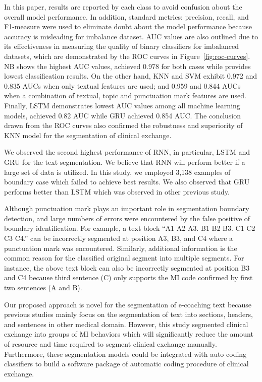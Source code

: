 \documentclass{amia}
\begin{document}
In this paper, results are reported by each class to avoid confusion about the overall model performance. In addition, standard metrics: precision, recall, and F1-measure were used to eliminate doubt about the model performance because accuracy is misleading for imbalance dataset. AUC values are also outlined due to its effectiveness in measuring the quality of binary classifiers for imbalanced datasets\cite{hu2015kernelized}, which are demonstrated by the ROC curves in Figure~\ref{fig:roc-curves}. NB shows the highest AUC values, achieved 0.978 for both cases while provides lowest classification results. On the other hand, KNN and SVM exhibit 0.972 and 0.835 AUCs when only textual features are used; and 0.959 and 0.844 AUCs when a combination of textual, topic and punctuation mark features are used. Finally, LSTM demonstrates lowest AUC values among all machine learning models, achieved 0.82 AUC while GRU achieved 0.854 AUC. The conclusion drawn from the ROC curves also confirmed the robustness and superiority of KNN model for the segmentation of clinical exchange.      

We observed the second highest performance of RNN, in particular, LSTM and GRU for the text segmentation. We believe that RNN will perform better if a large set of data is utilized. In this study, we employed 3,138 examples of boundary case which failed to achieve best results. We also observed that GRU performs better than LSTM which was observed in other previous study\cite{chung2014empirical}.

Although punctuation mark plays an important role in segmentation boundary detection, and large numbers of errors were encountered by the false positive of boundary identification. For example, a text block ``A1 A2 A3. B1 B2 B3. C1 C2 C3 C4.'' can be incorrectly segmented at position A3, B3, and C4 where a punctuation mark was encountered. Similarly, additional information is the common reason for the classified original segment into multiple segments. For instance, the above text block can also be incorrectly segmented at position B3 and C4 because third sentence (C) only supports the MI code confirmed by first two sentences (A and B). 

Our proposed approach is novel for the segmentation of e-coaching text because previous studies mainly focus on the segmentation of text into sections, headers, and sentences in other medical domain. However, this study segmented clinical exchange into groups of MI behaviors which will significantly reduce the amount of resource and time required to segment clinical exchange manually. Furthermore, these segmentation models could be integrated with auto coding classifiers to build a software package of automatic coding procedure of clinical exchange.
\end{document}
